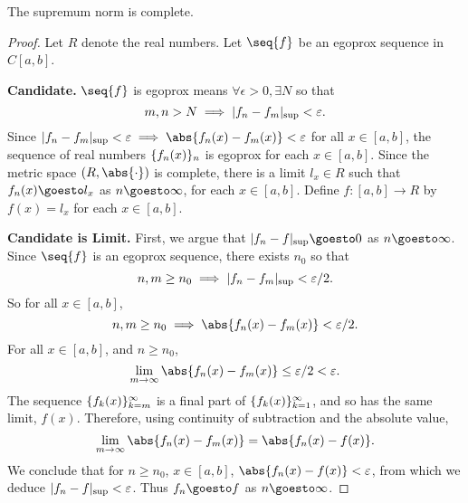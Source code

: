 \begin{prop}
The supremum norm
is complete.

\begin{proof}
Let $R$ denote the real numbers.
Let $\seq{f}$ be an egoprox sequence
in $C[a, b]$.

\textbf{Candidate.}
$\seq{f}$ is egoprox means
$\forall \epsilon > 0, \exists N$
so that
\[
  m, n > N \implies \lvert f_n - f_m\rvert_{\sup} < \varepsilon.
\]
Since $\supnorm{f_n - f_m} < \epsilon \implies
\abs{f_n(x) - f_m(x)} < \epsilon$ for
all $x \in [a, b]$, the
sequence of real numbers $\{f_n(x)\}_n$
is egoprox for each $x \in [a, b]$.
Since the metric space $(R, \abs{\cdot})$
is complete, there is a limit $l_x \in R$
such that $f_n(x) \goesto l_x$ as
$n \goesto \infty$, for each $x \in [a, b]$.
Define $f: [a, b] \to R$
by $f(x) = l_x$ for each $x \in [a, b]$.

\textbf{Candidate is Limit.}
First, we argue that
$\supnorm{f_n - f} \goesto 0$
as $n \goesto \infty$.
Since $\seq{f}$ is an egoprox sequence,
there exists $n_0$ so that
\[
  n,m \geq n_0
  \implies
  \lvert f_n - f_m\rvert_{\sup} < \varepsilon/2.
\]
So for all $x \in [a, b]$,
\[
  n,m \geq n_0
  \implies
  \abs{f_n(x) - f_m(x)} < \epsilon/2.
\]
For all $x \in [a, b]$,
and $n \geq n_0$,
\[
  \lim_{m \to \infty} \abs{f_n(x) - f_m(x)}
  \leq \epsilon/2 < \epsilon.
\]
The sequence
$\{f_k(x)\}_{k = m}^{\infty}$
is a final part of
$\{f_k(x)\}_{k = 1}^{\infty}$,
and so has the same limit, $f(x)$.
Therefore, using continuity
of subtraction and the absolute
value,
\[
  \lim_{m \to \infty}
    \abs{f_n(x) - f_m(x)}
  =
  \abs{f_n(x) - f(x)}.
\]
We conclude that for
$n \geq n_0$,
$x \in [a, b]$,
$\abs{f_n(x) - f(x)} < \epsilon$,
from which we deduce
$\lvert f_n - f\rvert_{\sup} < \varepsilon$.
Thus $f_n \goesto f$
as $n \goesto \infty$.


\end{proof}
\end{prop}
